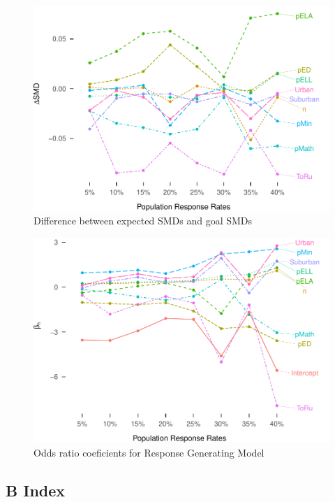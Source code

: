 \documentclass[man,floatsintext]{apa6}
\begin{document}
\begin{figure}
\centering
\includegraphics{Results_files/figure-latex/unnamed-chunk-3-1.pdf}
\caption{\label{fig:unnamed-chunk-3}Difference between expected SMDs and goal SMDs}
\end{figure}

\begin{figure}
\centering
\includegraphics{Results_files/figure-latex/unnamed-chunk-4-1.pdf}
\caption{\label{fig:unnamed-chunk-4}Odds ratio coeficients for Response Generating Model}
\end{figure}

\hypertarget{b-index}{%
\subsection{B Index}\label{b-index}}
\end{document}

